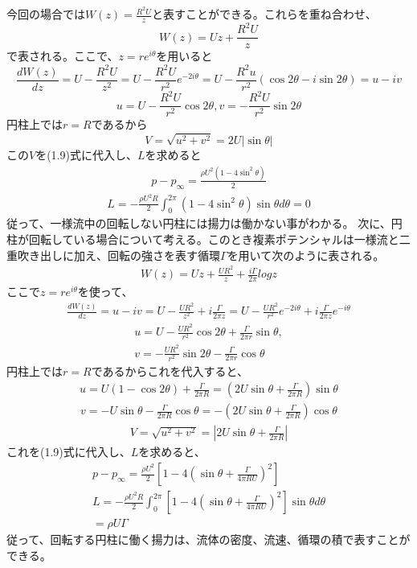 \documentclass[10pt,b5paper,papersize,dvipdfmx]{jsbook}
\begin{document}
今回の場合では$W(z)=\frac{R^2U}{z}$と表すことができる。これらを重ね合わせ、
\begin{equation}
  W(z)=Uz+\frac{R^2U}{z}
\end{equation}
で表される。ここで、$z=re^{i\theta}$を用いると
\begin{equation}
  \frac{dW(z)}{dz}=U-\frac{R^2U}{z^2}=U-\frac{R^2U}{r^2}e^{-2i\theta}=U-\frac{R^2u}{r^2}(\cos2\theta-i\sin2\theta)=u-iv
\end{equation}
\begin{equation}
　u=U-\frac{R^2U}{r^2}\cos2\theta, v=-\frac{R^2U}{r^2}\sin2\theta
\end{equation}
円柱上では$r=R$であるから
\begin{equation}
  V=\sqrt{u^2+v^2}=2U|\sin\theta|
\end{equation}
この$V$を(1.9)式に代入し、$L$を求めると
\begin{align}
  p - p_\infty = \frac{\rho U^2(1 - 4\sin ^2\theta)}{2}
\end{align}
\begin{align}
  L = -\frac{\rho U^2R}{2} \int_0^{2\pi} (1-4\sin ^2\theta)\sin\theta d\theta 
    = 0
\end{align}
従って、一様流中の回転しない円柱には揚力は働かない事がわかる。
次に、円柱が回転している場合について考える。このとき複素ポテンシャルは一様流と二重吹き出しに加え、回転の強さを表す循環$\Gamma$を用いて次のように表される。
\begin{align}
  W(z) = Uz + \frac{UR^2}{z} + \frac{i\Gamma}{2\pi}log z
\end{align}
ここで$z=re^{i\theta}$を使って、
\begin{align}
  \frac{dW(z)}{dz} = u - iv = U - \frac{UR^2}{z^2} + i\frac{\Gamma}{2\pi z} = U - \frac{UR^2}{r^2}e^{-2i\theta} + i\frac{\Gamma}{2\pi z}e^{-i\theta}
\end{align}
\begin{align}
  u = U - \frac{UR^2}{r^2}\cos 2\theta + \frac{\Gamma}{2\pi r}\sin\theta ,\\
  v = -\frac{UR^2}{r^2}\sin 2\theta - \frac{\Gamma}{2\pi r}\cos\theta
\end{align}
円柱上では$r=R$であるからこれを代入すると、
\begin{align}
  u = U(1 - \cos 2\theta) + \frac{\Gamma}{2\pi R} = (2U\sin\theta + \frac{\Gamma}{2\pi R})\sin\theta
\end{align}
\begin{align}
  v = -U\sin\theta - \frac{\Gamma}{2\pi R}\cos\theta = -(2U\sin\theta + \frac{\Gamma}{2\pi R})\cos\theta
\end{align}
\begin{align}
  V = \sqrt{u^2 + v^2} = |2U\sin\theta + \frac{\Gamma}{2\pi R}|
\end{align}
これを(1.9)式に代入し、$L$を求めると、
\begin{align}
  p - p_\infty = \frac{\rho U^2}{2}[1 - 4(\sin\theta + \frac{\Gamma}{4\pi RU})^2]\\
  L = -\frac{\rho U^2R}{2}\int_0^{2\pi} [1 -4(\sin\theta + \frac{\Gamma}{4\pi RU})^2]\sin\theta d\theta \\
    = \rho U\Gamma
\end{align}
従って、回転する円柱に働く揚力は、流体の密度、流速、循環の積で表すことができる。
\end{document}
